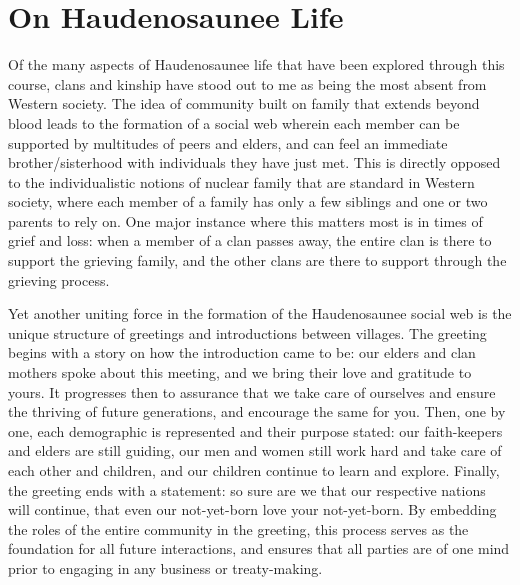 \documentclass{report}
\begin{document}
\section{On Haudenosaunee Life}

\hspace{24pt} Of the many aspects of Haudenosaunee life that have been explored through this course, clans and kinship have stood out to me as being the most absent from Western society. The idea of community built on family that extends beyond blood leads to the formation of a social web wherein each member can be supported by multitudes of peers and elders, and can feel an immediate brother/sisterhood with individuals they have just met. This is directly opposed to the individualistic notions of nuclear family that are standard in Western society, where each member of a family has only a few siblings and one or two parents to rely on. One major instance where this matters most is in times of grief and loss: when a member of a clan passes away, the entire clan is there to support the grieving family, and the other clans are there to support through the grieving process.

\hspace{24pt} Yet another uniting force in the formation of the Haudenosaunee social web is the unique structure of greetings and introductions between villages. 
The greeting begins with a story on how the introduction came to be: our elders  and clan mothers spoke about this meeting, and we bring their love and gratitude to yours. It progresses then to assurance that we take care of ourselves and ensure the thriving of future generations, and encourage the same for you.
Then, one by one, each demographic is represented and their purpose stated: our faith-keepers and elders are still guiding, our men and women still work hard and take care of each other and children, and our children continue to learn and explore. Finally, the greeting ends with a statement: so sure are we that our respective nations will continue, that even our not-yet-born love your not-yet-born.
By embedding the roles of the entire community in the greeting, this process serves as the foundation for all future interactions, and ensures that all parties are of one mind prior to engaging in any business or treaty-making.


\end{document}
